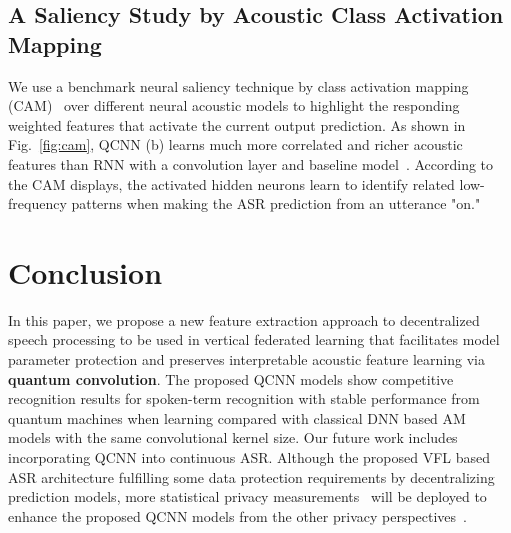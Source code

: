 \documentclass{article}
\begin{document}
\subsection{A Saliency Study by Acoustic Class Activation Mapping}
We use a benchmark neural saliency technique by class activation mapping (CAM)~\cite{zhou2016learning} over different neural acoustic models to highlight the responding weighted features that activate the current output prediction. As shown in Fig.~\ref{fig:cam}, QCNN (b) learns much more correlated and richer acoustic features than RNN with a convolution layer and baseline model~\cite{de2018neural}. According to the CAM displays, the activated hidden neurons learn to identify related low-frequency patterns when making the ASR prediction from an utterance "on."

\section{Conclusion}
\label{sec:conclusion}
In this paper, we propose a new feature extraction approach to decentralized speech processing to be used in vertical federated learning that facilitates model parameter protection and preserves interpretable acoustic feature learning via \textbf{quantum convolution}. The proposed QCNN models show competitive recognition results for spoken-term recognition with stable performance from quantum machines when learning compared with classical DNN based AM models with the same convolutional kernel size. Our future work includes incorporating QCNN into continuous ASR. Although the proposed VFL based ASR architecture fulfilling some data protection requirements by decentralizing prediction models, more statistical privacy measurements~\cite{dwork2015reusable} will be deployed to enhance the proposed QCNN models from the other privacy perspectives~\cite{dwork2015reusable, leroy2019federated}. 


\clearpage



\end{document}
